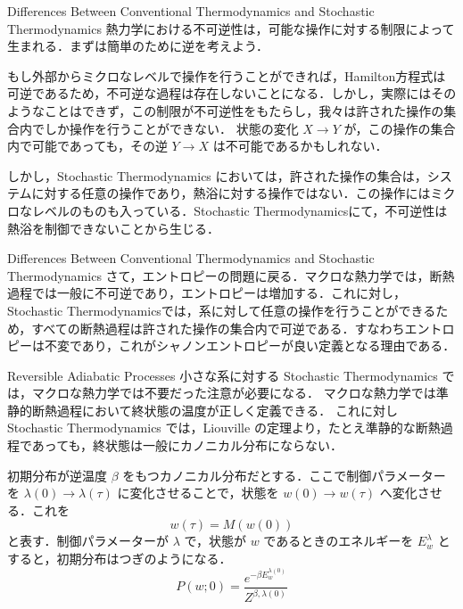 \documentclass[aspectratio=169, dvipdfmx, 11pt,uplatex]{beamer} %
\begin{document}
\begin{frame}{Differences Between Conventional Thermodynamics and Stochastic Thermodynamics}
  熱力学における不可逆性は，可能な操作に対する制限によって生まれる．まずは簡単のために逆を考えよう．\par 
  もし外部からミクロなレベルで操作を行うことができれば，Hamilton方程式は可逆であるため，不可逆な過程は存在しないことになる．しかし，実際にはそのようなことはできず，この制限が不可逆性をもたらし，我々は許された操作の集合内でしか操作を行うことができない．
  状態の変化 $X \to Y$ が，この操作の集合内で可能であっても，その逆 $Y \to X$ は不可能であるかもしれない．\par 
  しかし，Stochastic Thermodynamics においては，許された操作の集合は，システムに対する任意の操作であり，熱浴に対する操作ではない．この操作にはミクロなレベルのものも入っている．Stochastic Thermodynamicsにて，不可逆性は熱浴を制御できないことから生じる．
\end{frame}

\begin{frame}{Differences Between Conventional Thermodynamics and Stochastic Thermodynamics}
  さて，エントロピーの問題に戻る．マクロな熱力学では，断熱過程では一般に不可逆であり，エントロピーは増加する．これに対し，Stochastic Thermodynamicsでは，系に対して任意の操作を行うことができるため，すべての断熱過程は許された操作の集合内で可逆である．すなわちエントロピーは不変であり，これがシャノンエントロピーが良い定義となる理由である．
\end{frame}

\begin{frame}{Reversible Adiabatic Processes}
  小さな系に対する Stochastic Thermodynamics では，マクロな熱力学では不要だった注意が必要になる．
  マクロな熱力学では準静的断熱過程において終状態の温度が正しく定義できる．
  これに対し Stochastic Thermodynamics では，Liouville の定理より，たとえ準静的な断熱過程であっても，終状態は一般にカノニカル分布にならない．\par 
  初期分布が逆温度 $\beta $ をもつカノニカル分布だとする．ここで制御パラメーターを $\lambda(0) \to \lambda(\tau )$ に変化させることで，状態を $w(0) \to w(\tau )$ へ変化させる．これを
  \begin{equation}
    w (\tau) = M(w(0))
  \end{equation}
  と表す．制御パラメーターが $\lambda$ で，状態が $w$ であるときのエネルギーを $E_w^{\lambda }$ とすると，初期分布はつぎのようになる．
  \begin{equation}
    P(w; 0) = \frac{e^{- \beta E_w^{\lambda(0)}}}{Z^{\beta, \lambda(0)}}
  \end{equation}
\end{frame}
\end{document}
